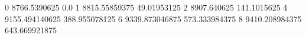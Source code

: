 0 8766.5390625 0.0
1 8815.55859375 49.01953125
2 8907.640625 141.1015625
4 9155.494140625 388.955078125
6 9339.873046875 573.333984375
8 9410.208984375 643.669921875
